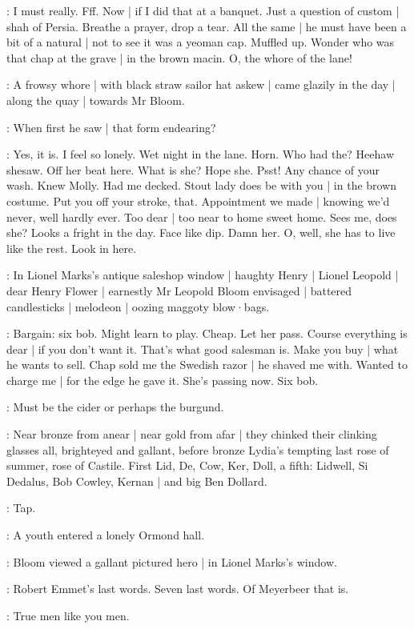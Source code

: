 \BloomInt:
I must really.
Fff.
Now |
if I did that at a banquet.
Just a question of custom |
shah of Persia.
Breathe a prayer,
drop a tear.
All the same |
he must have been a bit of a natural |
not to see it was a yeoman cap.
Muffled up.
Wonder who was that chap at the grave |
in the brown macin.
O,
the whore of the lane!

:
A frowsy whore |
with black straw sailor hat askew |
came glazily in the day |
along the quay |
towards Mr Bloom.

:
When first he saw |
that form endearing?

\BloomInt:
Yes,
it is.
I feel so lonely.
Wet night in the lane.
Horn.
Who had the?
Heehaw shesaw.
Off her beat here.
What is she?
Hope she.
Psst!
Any chance of your wash.
Knew Molly.
Had me decked.
Stout lady does be with you |
in the brown costume.
Put you off your stroke,
that.
Appointment we made |
knowing we'd never,
well hardly ever.
Too dear |
too near to home sweet home.
Sees me,
does she?
Looks a fright in the day.
Face like dip.
Damn her.
O,
well,
she has to live like the rest.
Look in here.

:
In Lionel Marks's antique saleshop window |
haughty Henry |
Lionel Leopold |
dear Henry Flower |
earnestly Mr Leopold Bloom envisaged |
battered candlesticks |
melodeon |
oozing maggoty blow·bags.

\BloomInt:
Bargain:
six bob.
Might learn to play.
Cheap.
Let her pass.
Course everything is dear |
if you don't want it.
That's what good salesman is.
Make you buy |
what he wants to sell.
Chap sold me the Swedish razor |
he shaved me with.
Wanted to charge me |
for the edge he gave it.
She's passing now.
Six bob.

\BloomInt:
Must be the cider or perhaps the burgund.

:
Near bronze from anear |
near gold from afar |
they chinked their clinking glasses all,
brighteyed and gallant,
before bronze Lydia's tempting
last rose of summer,
rose of Castile.
First Lid,
De,
Cow,
Ker,
Doll,
a fifth:
Lidwell,
Si Dedalus,
Bob Cowley,
Kernan |
and big Ben Dollard.

\stripling:
Tap.

:
A youth entered a lonely Ormond hall.

:
Bloom viewed a gallant pictured hero |
in Lionel Marks's window.

\BloomInt:
Robert Emmet's last words.
Seven last words.
Of Meyerbeer that is.

\dollard:
True men like you men.

